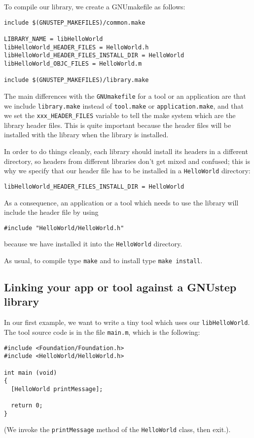 \documentclass[a4paper]{article}
\begin{document}
To compile our library, we create a GNUmakefile as follows: 
\begin{verbatim}
include $(GNUSTEP_MAKEFILES)/common.make

LIBRARY_NAME = libHelloWorld
libHelloWorld_HEADER_FILES = HelloWorld.h
libHelloWorld_HEADER_FILES_INSTALL_DIR = HelloWorld
libHelloWorld_OBJC_FILES = HelloWorld.m

include $(GNUSTEP_MAKEFILES)/library.make
\end{verbatim}

The main differences with the \texttt{GNUmakefile} for a tool or an
application are that we include \texttt{library.make} instead of
\texttt{tool.make} or \texttt{application.make}, and that we set the
\texttt{xxx\_HEADER\_FILES} variable to tell the make system which are
the library header files.  This is quite important because the header
files will be installed with the library when the library is
installed.

In order to do things cleanly, each library should install its headers
in a different directory, so headers from different libraries don't
get mixed and confused; this is why we specify that our header file
has to be installed in a \texttt{HelloWorld} directory:
\begin{verbatim}
libHelloWorld_HEADER_FILES_INSTALL_DIR = HelloWorld
\end{verbatim}
As a consequence, an application or a tool which needs to use the
library will include the header file by using
\begin{verbatim}
#include "HelloWorld/HelloWorld.h"
\end{verbatim}
because we have installed it into the \texttt{HelloWorld} directory.

As usual, to compile type \texttt{make} and to install type
\texttt{make install}.

\subsection{Linking your app or tool against a GNUstep library}
In our first example, we want to write a tiny tool which uses our 
\texttt{libHelloWorld}.  The tool source code is in the file 
\texttt{main.m}, which is the following:
\begin{verbatim}
#include <Foundation/Foundation.h>
#include <HelloWorld/HelloWorld.h>

int main (void)
{
  [HelloWorld printMessage];

  return 0;
}
\end{verbatim}
(We invoke the \texttt{printMessage} method of the \texttt{HelloWorld} 
class, then exit.).
\end{document}
